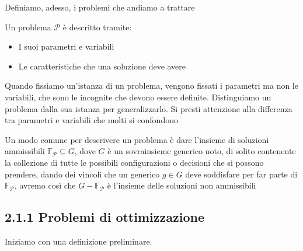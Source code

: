 Definiamo, adesso, i problemi che andiamo a trattare

Un problema $ \mathcal{P} $ è descritto tramite:
\begin{itemize}
  \item I suoi parametri e variabili
  \item Le caratteristiche che una soluzione deve avere
\end{itemize}

Quando fissiamo un'istanza di un problema, vengono fissati i parametri ma non le variabili, che sono le incognite che devono essere definite. Distinguiamo un problema dalla sua istanza per generalizzarlo. Si presti attenzione alla differenza tra parametri e variabili che molti si confondono

Un modo comune per descrivere un problema è dare l'insieme di soluzioni ammissibili $ \mathbb{F}_{\mathcal{P}} \subseteq G $, dove $G$ è un sovrainsieme generico noto, di solito contenente la collezione di tutte le possibili configurazioni o decisioni che si possono prendere, dando dei vincoli che un generico $ g \in G $ deve soddisfare per far parte di $\mathbb{F}_{\mathcal{P}}$, avremo così che $G - \mathbb{F}_{\mathcal{P}}$ è l'insieme delle soluzioni non ammissibili 
\subsection{2.1.1 Problemi di ottimizzazione}

Iniziamo con una definizione preliminare.


